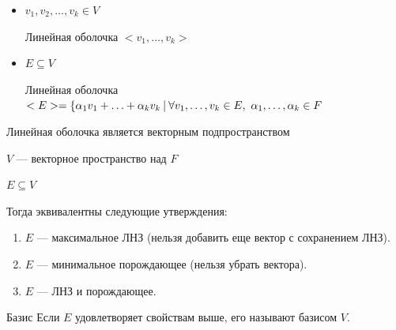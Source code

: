 \begin{defn}{}{}
    \begin{itemize}
        \item
            \( v_1, v_2, \ldots, v_k \in V \)

            Линейная оболочка \( < v_1, \ldots, v_k > \)
        \item
            \( E \subseteq V \)

            Линейная оболочка
            \(
                <E> = \{ \alpha_1 v_1 + \ldots + \alpha_k v_k
                \ \vline \
                \forall v_1, \ldots, v_k \in E, \ \alpha_1, \ldots, \alpha_k \in F
            \)
    \end{itemize}
\end{defn}

\begin{remark}{}{}
    Линейная оболочка является векторным подпространством
\end{remark}

\begin{thrm}{}{}
    \( V \) --- векторное пространство над \( F \)

    \( E \subseteq V \)

    Тогда эквивалентны следующие утверждения:
    \begin{enumerate}
        \item
            \( E \) --- максимальное ЛНЗ (нельзя добавить еще вектор с сохранением ЛНЗ).
        \item
            \( E \) --- минимальное порождающее (нельзя убрать вектора).
        \item
            \( E \) --- ЛНЗ и порождающее.
    \end{enumerate}
\end{thrm}

\begin{defn}{Базис}{}
    Если \( E \) удовлетворяет свойствам выше, его называют базисом \( V \).
\end{defn}

